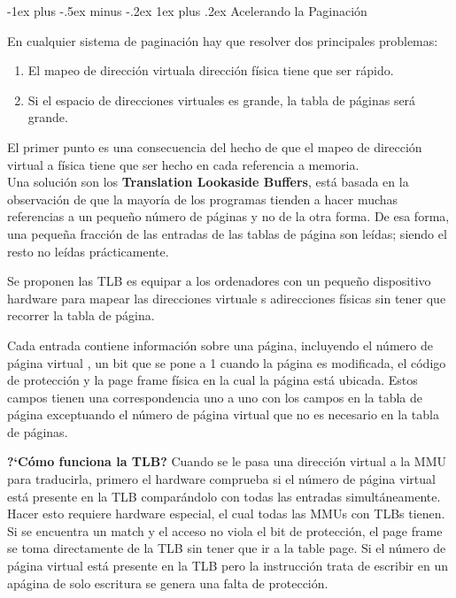 \documentclass[10pt,portrait, twocolumn]{article}
\makeatletter
\renewcommand{\subsubsection}{\@startsection{subsubsection}{3}{0mm}%
                                {-1ex plus -.5ex minus -.2ex}%
                                {1ex plus .2ex}%
                                {\normalfont\small\bfseries}}
\makeatother
\begin{document}
\subsubsection{Acelerando la Paginación}

En cualquier sistema de paginación hay que resolver dos principales problemas:

	\begin{enumerate}
	\item El mapeo de dirección virtuala  dirección física tiene que ser rápido.
	\item Si el espacio de direcciones virtuales es grande, la tabla de páginas será grande.
	\end{enumerate}
	
El primer punto es una consecuencia del hecho de que el mapeo de dirección virtual a física tiene que ser hecho en cada referencia a memoria.\\

Una solución son los \textbf{Translation Lookaside Buffers}, está basada en la observación de que la mayoría de los programas tienden a hacer muchas referencias a un pequeño número de páginas y no de la otra forma. De esa forma, una pequeña fracción de las entradas de las  tablas de página son leídas; siendo el resto no leídas prácticamente.

	\quad Se proponen las TLB es equipar a los ordenadores con un pequeño dispositivo hardware para mapear las direcciones virtuale s adirecciones físicas sin tener que recorrer la tabla de página. 
	
	\quad Cada entrada contiene información sobre una página, incluyendo el número de página virtual , un bit que se pone a 1 cuando la página es modificada, el código de protección y la page frame física en la cual la página está ubicada. Estos campos tienen una correspondencia uno a uno con los campos en la tabla de página exceptuando el número de página virtual que no es necesario en la tabla de páginas.
	
	\quad \textbf{?`Cómo funciona la TLB?} Cuando se le pasa una dirección virtual a la MMU para traducirla, primero el hardware comprueba si el número de página virtual está presente en la TLB comparándolo con todas las entradas simultáneamente. Hacer esto requiere hardware especial, el cual todas las MMUs con TLBs tienen. Si se encuentra un match y el acceso no viola el bit de protección, el page frame se toma directamente de la TLB sin tener que ir a la table page. Si el número de página virtual está presente en la TLB pero la instrucción trata de escribir en un apágina de solo escritura se genera una falta de protección.
	
\end{document}
